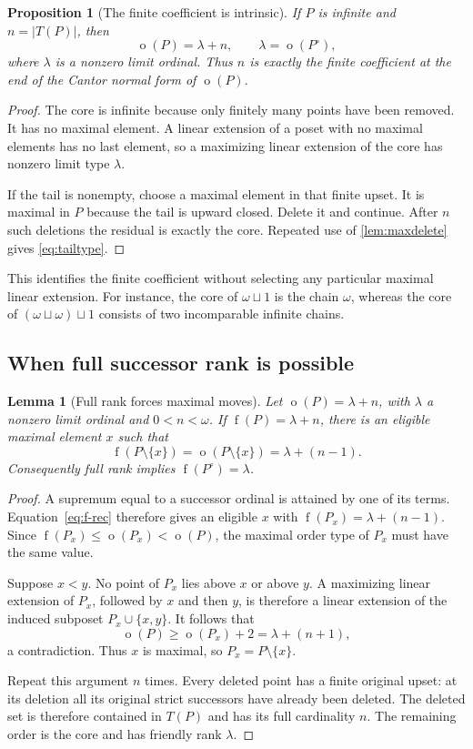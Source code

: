 \documentclass[11pt,a4paper]{article}
\newtheorem{lemma}[lemma]{Lemma}
\newtheorem{proposition}[proposition]{Proposition}
\theoremstyle{definition}
\theoremstyle{remark}
\DeclareMathOperator{\mot}{o}
\DeclareMathOperator{\fot}{f}
\newcommand{\core}[1]{{#1}^{\circ}}
\newcommand{\ds}{\mathbin{\sqcup}}
\begin{document}
\begin{proposition}[The finite coefficient is intrinsic]\label{prop:tailtype}
If $P$ is infinite and $n=|T(P)|$, then
\begin{equation}\label{eq:tailtype}
\mot(P)=\lambda+n,\qquad\lambda=\mot(\core{P}),
\end{equation}
where $\lambda$ is a nonzero limit ordinal. Thus $n$ is exactly the finite
coefficient at the end of the Cantor normal form of $\mot(P)$.
\end{proposition}
\begin{proof}
The core is infinite because only finitely many points have been removed.
It has no maximal element. A linear extension of a poset with no maximal
elements has no last element, so a maximizing linear extension of the core
has nonzero limit type $\lambda$.

If the tail is nonempty, choose a maximal element in that finite upset. It
is maximal in $P$ because the tail is upward closed. Delete it and continue.
After $n$ such deletions the residual is exactly the core. Repeated use of
\cref{lem:maxdelete} gives \eqref{eq:tailtype}.
\end{proof}

This identifies the finite coefficient without selecting any particular
maximal linear extension. For instance, the core of $\omega\ds1$ is the
chain $\omega$, whereas the core of $(\omega\ds\omega)\ds1$ consists of two
incomparable infinite chains.

\subsection{When full successor rank is possible}

\begin{lemma}[Full rank forces maximal moves]\label{lem:fullmax}
Let $\mot(P)=\lambda+n$, with $\lambda$ a nonzero limit ordinal and
$0<n<\omega$. If $\fot(P)=\lambda+n$, there is an eligible maximal element
$x$ such that
\[
\fot(P\setminus\{x\})=\mot(P\setminus\{x\})=\lambda+(n-1).
\]
Consequently full rank implies $\fot(\core{P})=\lambda$.
\end{lemma}
\begin{proof}
A supremum equal to a successor ordinal is attained by one of its terms.
Equation~\eqref{eq:f-rec} therefore gives an eligible $x$ with
$\fot(P_x)=\lambda+(n-1)$. Since
$\fot(P_x)\leq\mot(P_x)<\mot(P)$, the maximal order type of $P_x$ must have
the same value.

Suppose $x<y$. No point of $P_x$ lies above $x$ or above $y$. A maximizing
linear extension of $P_x$, followed by $x$ and then $y$, is therefore a
linear extension of the induced subposet $P_x\cup\{x,y\}$. It follows that
\[
\mot(P)\geq\mot(P_x)+2=\lambda+(n+1),
\]
a contradiction. Thus $x$ is maximal, so $P_x=P\setminus\{x\}$.

Repeat this argument $n$ times. Every deleted point has a finite original
upset: at its deletion all its original strict successors have already
been deleted. The deleted set is therefore contained in $T(P)$ and has
its full cardinality $n$. The remaining order is the core and has friendly
rank $\lambda$.
\end{proof}
\end{document}
